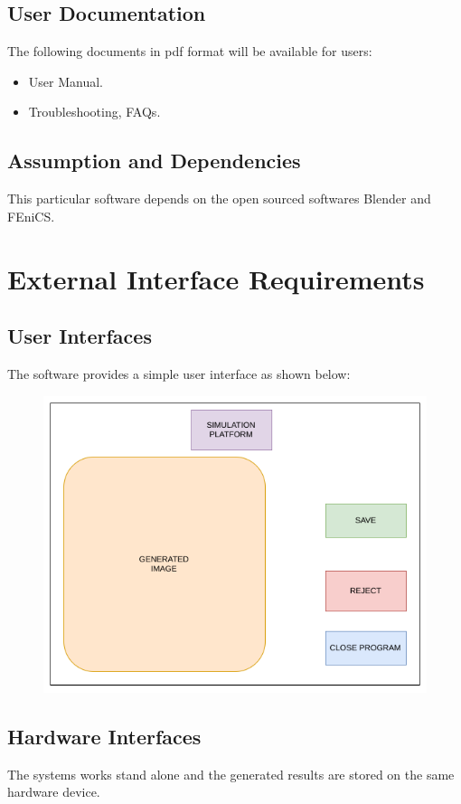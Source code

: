 \documentclass[a4paper,12pt]{article}
\begin{document}
\subsection{User Documentation}
The following documents in pdf format will be available for users:
\begin{itemize}
\item User Manual.
\item Troubleshooting, FAQs.
\end{itemize}
\subsection{Assumption and Dependencies}
This particular software depends on the open sourced softwares Blender and FEniCS.
\newpage

\section{External Interface Requirements}
\subsection{User Interfaces}
The software provides a simple user interface as shown below:
\begin{figure}[H]
\includegraphics[scale=0.75]{gui.png}
\end{figure}
\subsection{Hardware Interfaces}
The systems works stand alone and the generated results are stored on the same hardware device.
\end{document}
